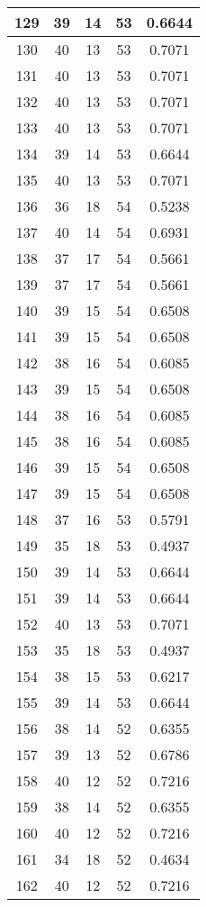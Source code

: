 \documentclass[letterpaper, 12pt]{article}
\begin{document}
\begin{longtable}{|c|c|c|c|c|}
\hline
129 & 39 & 14 & 53 & 0.6644 \\
\hline
130 & 40 & 13 & 53 & 0.7071 \\
\hline
131 & 40 & 13 & 53 & 0.7071 \\
\hline
132 & 40 & 13 & 53 & 0.7071 \\
\hline
133 & 40 & 13 & 53 & 0.7071 \\
\hline
134 & 39 & 14 & 53 & 0.6644 \\
\hline
135 & 40 & 13 & 53 & 0.7071 \\
\hline
136 & 36 & 18 & 54 & 0.5238 \\
\hline
137 & 40 & 14 & 54 & 0.6931 \\
\hline
138 & 37 & 17 & 54 & 0.5661 \\
\hline
139 & 37 & 17 & 54 & 0.5661 \\
\hline
140 & 39 & 15 & 54 & 0.6508 \\
\hline
141 & 39 & 15 & 54 & 0.6508 \\
\hline
142 & 38 & 16 & 54 & 0.6085 \\
\hline
143 & 39 & 15 & 54 & 0.6508 \\
\hline
144 & 38 & 16 & 54 & 0.6085 \\
\hline
145 & 38 & 16 & 54 & 0.6085 \\
\hline
146 & 39 & 15 & 54 & 0.6508 \\
\hline
147 & 39 & 15 & 54 & 0.6508 \\
\hline
148 & 37 & 16 & 53 & 0.5791 \\
\hline
149 & 35 & 18 & 53 & 0.4937 \\
\hline
150 & 39 & 14 & 53 & 0.6644 \\
\hline
151 & 39 & 14 & 53 & 0.6644 \\
\hline
152 & 40 & 13 & 53 & 0.7071 \\
\hline
153 & 35 & 18 & 53 & 0.4937 \\
\hline
154 & 38 & 15 & 53 & 0.6217 \\
\hline
155 & 39 & 14 & 53 & 0.6644 \\
\hline
156 & 38 & 14 & 52 & 0.6355 \\
\hline
157 & 39 & 13 & 52 & 0.6786 \\
\hline
158 & 40 & 12 & 52 & 0.7216 \\
\hline
159 & 38 & 14 & 52 & 0.6355 \\
\hline
160 & 40 & 12 & 52 & 0.7216 \\
\hline
161 & 34 & 18 & 52 & 0.4634 \\
\hline
162 & 40 & 12 & 52 & 0.7216 \\

\end{longtable}
\end{document}
